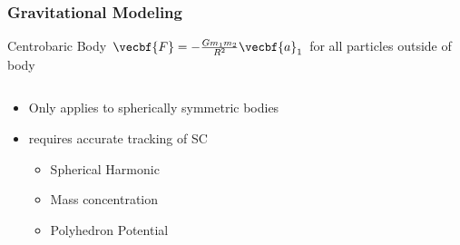 \begin{frame}[noframenumbering,label=centrobaric]
\frametitle{Gravitational Modeling}
\begin{block}{Centrobaric Body}
    \( \vecbf{F} = -\frac{G m_1 m_2}{R^2} \vecbf{a}_1 \) for all particles outside of body
\end{block}

\begin{columns}
    \begin{column}{0.5\textwidth}
        \begin{itemize}
            \item<2-> Only applies to spherically symmetric bodies 
            \item<3->  requires accurate tracking of SC
                \begin{itemize}
                    \item Spherical Harmonic
                    \item Mass concentration
                    \item Polyhedron Potential
                \end{itemize}
        \end{itemize}
    \end{column}
    \begin{column}{0.5\textwidth}
    \end{column}
\end{columns}

\end{frame}

